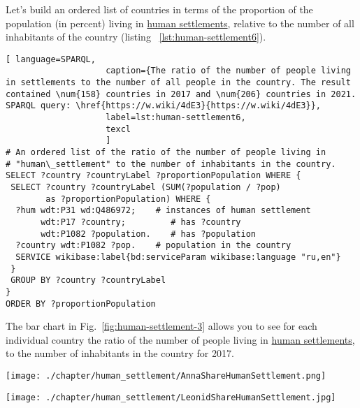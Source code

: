 Let's build an ordered list of countries in terms of the proportion of the population (in percent) living in \href{http://www.wikidata.org/entity/Q486972} {human settlements}, relative to the number of all inhabitants of the country (listing ~\ref{lst:human-settlement6}).

\begin{lstlisting}[ language=SPARQL, 
                    caption={The ratio of the number of people living in settlements to the number of all people in the country. The result contained \num{158} countries in 2017 and \num{206} countries in 2021. SPARQL query: \href{https://w.wiki/4dE3}{https://w.wiki/4dE3}},
                    label=lst:human-settlement6,
                    texcl 
                    ]
# An ordered list of the ratio of the number of people living in 
# "human\_settlement" to the number of inhabitants in the country.
SELECT ?country ?countryLabel ?proportionPopulation WHERE {
 SELECT ?country ?countryLabel (SUM(?population / ?pop) 
        as ?proportionPopulation) WHERE {
  ?hum wdt:P31 wd:Q486972;    # instances of human settlement  
       wdt:P17 ?country;         # has ?country 
       wdt:P1082 ?population.    # has ?population
  ?country wdt:P1082 ?pop.    # population in the country
  SERVICE wikibase:label{bd:serviceParam wikibase:language "ru,en"}
 }
 GROUP BY ?country ?countryLabel
}
ORDER BY ?proportionPopulation
\end{lstlisting}%

The bar chart in Fig.~\ref{fig:human-settlement-3} allows you to see for each individual country the ratio of the number of people living in \href{http://www.wikidata.org/entity/Q486972 }{ human settlements}, to the number of inhabitants in the country for 2017.

\begin{figure*}
    \texttt{[image: ./chapter/human\_settlement/AnnaShareHumanSettlement.png]}
	\label{fig:human-settlement-3}
	\caption[Chart of the country's population share, 2017.]{Diagram of the share of the country's population living in ``human settlements'' for 2017. SPARQL query: \href{https://w.wiki/4dE3}{https://w.wiki/4dE3}}%
\end{figure*} 

\begin{figure*}
    \texttt{[image: ./chapter/human\_settlement/LeonidShareHumanSettlement.jpg]}
	\label{fig:human-settlement-4}
	\caption[Chart of the country's population share, 2021.]{Diagram of the share of the country's population living in ``human settlements'' for 2021. Countries with a population of more than 5 million people were selected. SPARQL query: \href{https://w.wiki/4dDx}{https://w.wiki/4dDx}}%
\end{figure*} 


